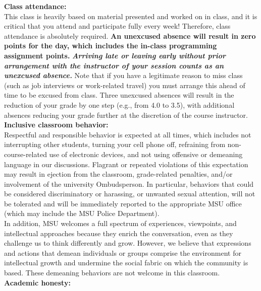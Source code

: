 \documentclass[oneside,letterpaper,11pt]{exam}
\begin{document}
{\noindent \textbf{Class attendance:}}\\[-5pt]

{\noindent This class is heavily based on material presented and worked on in class, and it is critical that you attend and participate fully every week! Therefore, class attendance is absolutely required. \textbf{An unexcused absence will result in zero points for the day, which includes the in-class programming assignment points.} \textbf{\emph{Arriving late or leaving early without prior arrangement with the instructor of your session counts as an unexcused absence.}} Note that if you have a legitimate reason to miss class (such as job interviews or work-related travel) you must arrange this ahead of time to be excused from class. Three unexcused absences will result in the reduction of your grade by one step (e.g., from 4.0 to 3.5), with additional absences reducing your grade further at the discretion of the course instructor.}\\


{\noindent \textbf{Inclusive classroom behavior:}}\\[-5pt]

{\noindent Respectful and responsible behavior is expected at all times, which includes not interrupting other students, turning your cell phone off, refraining from non-course-related use of electronic devices, and not using offensive or demeaning language in our discussions. Flagrant or repeated violations of this expectation may result in ejection from the classroom, grade-related penalties, and/or involvement of the university Ombudsperson. In particular, behaviors that could be considered discriminatory or harassing, or unwanted sexual attention, will not be tolerated and will be immediately reported to the appropriate MSU office (which may include the MSU Police Department).}\\[-5pt]

{\noindent In addition, MSU welcomes a full spectrum of experiences, viewpoints, and intellectual approaches because they enrich the conversation, even as they challenge us to think differently and grow. However, we believe that expressions and actions that demean individuals or groups comprise the environment for intellectual growth and undermine the social fabric on which the community is based. These demeaning behaviors are not welcome in this classroom.}\\


{\noindent \textbf{Academic honesty:}}\\[-5pt]
\end{document}

